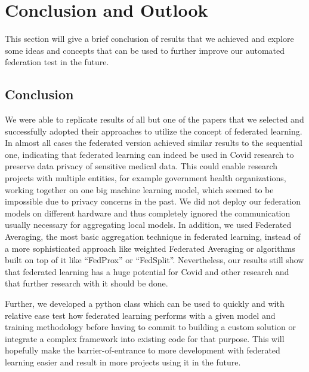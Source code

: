 \section{Conclusion and Outlook}
This section will give a brief conclusion of results that we achieved and explore some ideas and concepts that can be used to further improve our automated federation test in the future.  

\subsection{Conclusion}
We were able to replicate results of all but one of the papers that we selected and successfully adopted their approaches to utilize the concept of federated learning. In almost all cases the federated version achieved similar results to the sequential one, indicating that federated learning can indeed be used in Covid research to preserve data privacy of sensitive medical data. This could enable research projects with multiple entities, for example government health organizations, working together on one big machine learning model, which seemed to be impossible due to privacy concerns in the past.
We did not deploy our federation models on different hardware and thus completely ignored the communication usually necessary for aggregating local models. In addition, we used Federated Averaging, the most basic aggregation technique in federated learning, instead of a more sophisticated approach like weighted Federated Averaging or algorithms built on top of it like \enquote{FedProx}\cite{fed_prox} or \enquote{FedSplit}\cite{fed_split}. Nevertheless, our results still show that federated learning has a huge potential for Covid and other research and that further research with it should be done.

Further, we developed a python class which can be used to quickly and with relative ease test how federated learning performs with a given model and training methodology before having to commit to building a custom solution or integrate a complex framework into existing code for that purpose. This will hopefully make the barrier-of-entrance to more development with federated learning easier and result in more projects using it in the future.

